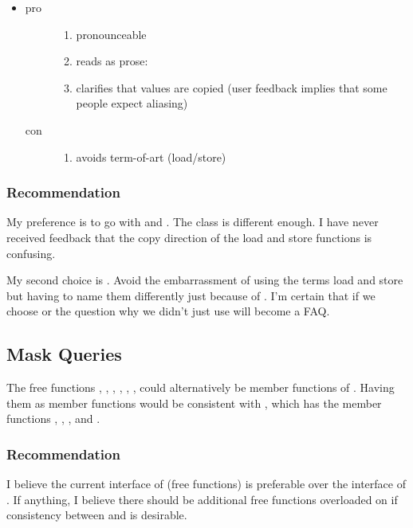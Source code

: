 \begin{itemize}
  \item {}
    \begin{description}
      \item[pro]
        \begin{enumerate}
          \item pronounceable
          \item reads as prose: 
          \item clarifies that values are copied
            (user feedback implies that some people expect aliasing)
        \end{enumerate}
      \item[con]
        \begin{enumerate}
          \item avoids term-of-art (load/store)
        \end{enumerate}
    \end{description}

\end{itemize}

\subsubsection{Recommendation}
My preference is to go with  and .
The  class is different enough.
I have never received feedback that the copy direction of the load and store functions is confusing.

My second choice is .
Avoid the embarrassment of using the terms load and store but having to name them differently just because of .
I'm certain that if we choose  or  the question why we didn't just use  will become a FAQ.

\subsection{Mask Queries}\label{sec:mask queries}
The free functions , , , , , ,  could alternatively be member functions of \mask.
Having them as member functions would be consistent with , which has the member functions , , , and .

\subsubsection{Recommendation}
I believe the current interface of \mask (free functions) is preferable over the interface of .
If anything, I believe there should be additional free functions overloaded on  if consistency between \mask and  is desirable.


